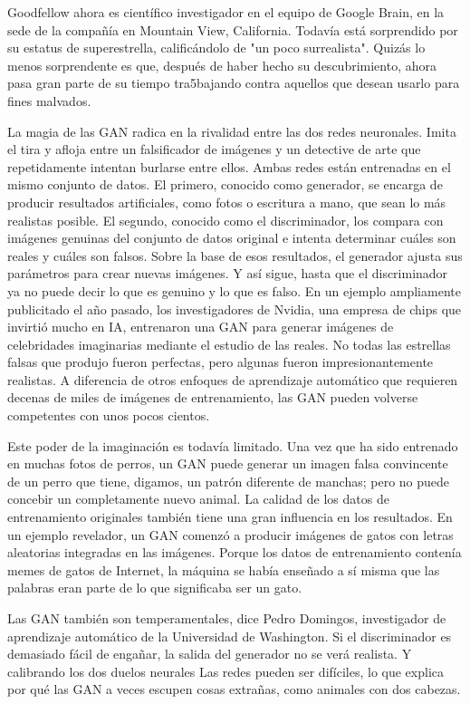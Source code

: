 \documentclass[a4paper]{article}
\begin{document}
Goodfellow ahora es científico investigador en el equipo de Google Brain, en la sede de la compañía en Mountain View,
California. Todavía está sorprendido por su estatus de superestrella, calificándolo de "un poco surrealista". Quizás lo menos sorprendente es que, después de haber hecho su descubrimiento, ahora pasa gran parte de su tiempo tra5bajando contra aquellos que desean usarlo para fines malvados.

La magia de las GAN radica en la rivalidad entre las dos redes neuronales. Imita el tira y afloja entre un falsificador de imágenes y un detective de arte que repetidamente intentan burlarse entre ellos. Ambas redes están entrenadas en el mismo conjunto de datos. El primero, conocido como generador, se encarga de producir resultados artificiales, como fotos o escritura a mano, que sean lo más realistas posible. El segundo, conocido como el discriminador, los compara con imágenes genuinas del conjunto de datos original e intenta determinar cuáles son reales y cuáles son falsos. Sobre la base de esos resultados, el generador ajusta sus parámetros para crear nuevas imágenes. Y así sigue, hasta que el discriminador ya no puede decir lo que es genuino y lo que es falso.
En un ejemplo ampliamente publicitado el año pasado, los investigadores de Nvidia, una empresa de chips que invirtió mucho en IA, entrenaron una GAN para generar imágenes de celebridades imaginarias mediante el estudio de las reales. No todas las estrellas falsas que produjo fueron perfectas, pero algunas fueron impresionantemente realistas. A diferencia de otros enfoques de aprendizaje automático que requieren decenas de miles de imágenes de entrenamiento, las GAN pueden volverse competentes con unos pocos cientos.

Este poder de la imaginación es todavía limitado. Una vez que ha sido entrenado en muchas fotos de perros, un GAN puede generar un
imagen falsa convincente de un perro que tiene, digamos, un patrón diferente de manchas; pero no puede concebir un completamente nuevo
animal. La calidad de los datos de entrenamiento originales también tiene una gran influencia en los resultados. En un ejemplo revelador, un
GAN comenzó a producir imágenes de gatos con letras aleatorias integradas en las imágenes. Porque los datos de entrenamiento
contenía memes de gatos de Internet, la máquina se había enseñado a sí misma que las palabras eran parte de lo que significaba ser un gato.

Las GAN también son temperamentales, dice Pedro Domingos, investigador de aprendizaje automático de la Universidad de Washington. Si el
discriminador es demasiado fácil de engañar, la salida del generador no se verá realista. Y calibrando los dos duelos neurales
Las redes pueden ser difíciles, lo que explica por qué las GAN a veces escupen cosas extrañas, como animales con dos cabezas.
\end{document}
